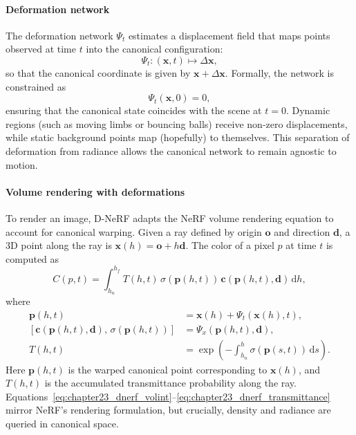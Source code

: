 \begin{enrichment}
\begin{enrichment}
    \paragraph{Deformation network}
    \noindent
    The deformation network $\Psi_t$ estimates a displacement field that maps points observed at time $t$ into the canonical configuration:
    \[
    \Psi_t : (\mathbf{x}, t) \mapsto \Delta \mathbf{x},
    \]
    so that the canonical coordinate is given by $\mathbf{x} + \Delta \mathbf{x}$.
    Formally, the network is constrained as
    \[
    \Psi_t(\mathbf{x}, 0) = 0,
    \]
    ensuring that the canonical state coincides with the scene at $t=0$.
    Dynamic regions (such as moving limbs or bouncing balls) receive non-zero displacements, while static background points map (hopefully) to themselves.
    This separation of deformation from radiance allows the canonical network to remain agnostic to motion.
    
    \paragraph{Volume rendering with deformations}
    \noindent
    To render an image, D-NeRF adapts the NeRF volume rendering equation to account for canonical warping.
    Given a ray defined by origin $\mathbf{o}$ and direction $\mathbf{d}$, a 3D point along the ray is $\mathbf{x}(h) = \mathbf{o} + h\mathbf{d}$.
    The color of a pixel $p$ at time $t$ is computed as
    \begin{equation}
        C(p, t) = \int_{h_n}^{h_f} T(h, t)\,\sigma(\mathbf{p}(h,t))\,\mathbf{c}(\mathbf{p}(h,t), \mathbf{d}) \, \mathrm{d}h,
        \label{eq:chapter23_dnerf_volint}
    \end{equation}
    where
    \begin{align}
        \mathbf{p}(h,t) &= \mathbf{x}(h) + \Psi_t(\mathbf{x}(h), t), \label{eq:chapter23_dnerf_warp} \\
        [\mathbf{c}(\mathbf{p}(h,t), \mathbf{d}), \, \sigma(\mathbf{p}(h,t))] &= \Psi_x(\mathbf{p}(h,t), \mathbf{d}), \label{eq:chapter23_dnerf_canonical}\\
        T(h,t) &= \exp\!\left(-\int_{h_n}^{h} \sigma(\mathbf{p}(s,t)) \, \mathrm{d}s\right). \label{eq:chapter23_dnerf_transmittance}
    \end{align}
    Here $\mathbf{p}(h,t)$ is the warped canonical point corresponding to $\mathbf{x}(h)$, and $T(h,t)$ is the accumulated transmittance probability along the ray.
    Equations~\ref{eq:chapter23_dnerf_volint}--\ref{eq:chapter23_dnerf_transmittance} mirror NeRF’s rendering formulation, but crucially, density and radiance are queried in canonical space.
    

\end{enrichment}
\end{enrichment}
